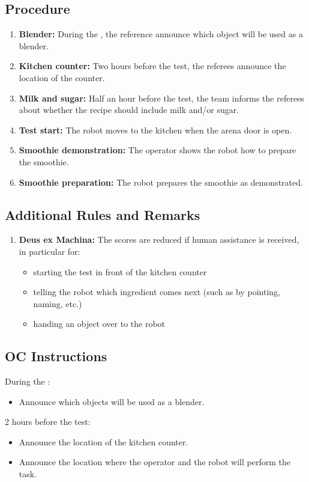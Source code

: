\subsection*{Procedure}
\begin{enumerate}[nosep]
    \item \textbf{Blender:} During the \SetupDays, the reference announce which object will be used as a blender.
    \item \textbf{Kitchen counter:} Two hours before the test, the referees announce the location of the counter.
    \item \textbf{Milk and sugar:} Half an hour before the test, the team informs the referees about whether the recipe should include milk and/or sugar.
    \item \textbf{Test start:} The robot moves to the kitchen when the arena door is open.
    \item \textbf{Smoothie demonstration:} The operator shows the robot how to prepare the smoothie.
    \item \textbf{Smoothie preparation:} The robot prepares the smoothie as demonstrated.
\end{enumerate}


\subsection*{Additional Rules and Remarks}
\begin{enumerate}
	\item \textbf{Deus ex Machina:} The scores are reduced if human assistance is received, in particular for:
	\begin{itemize}[nosep]
		\item starting the test in front of the kitchen counter
		\item telling the robot which ingredient comes next (such as by pointing, naming, etc.)
		\item handing an object over to the robot
	\end{itemize}
\end{enumerate}

\subsection*{OC Instructions}
During the \SetupDays:
\begin{itemize}
	\item Announce which objects will be used as a blender.
\end{itemize}
2 hours before the test:
\begin{itemize}
	\item Announce the location of the kitchen counter.
	\item Announce the location where the operator and the robot will perform the task.
\end{itemize}


